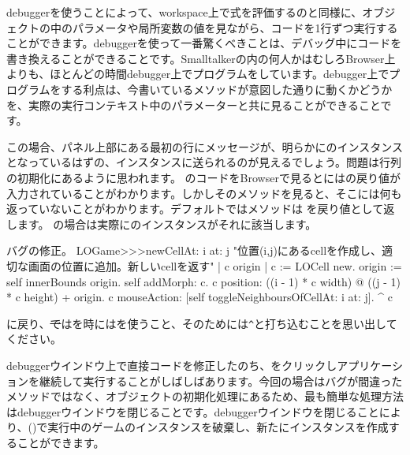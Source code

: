 \documentclass[a4paper,10pt,twoside]{book}
\begin{document}
debuggerを使うことによって、workspace上で式を評価するのと同様に、オブジェクトの中のパラメータや局所変数の値を見ながら、コードを1行ずつ実行することができます。debuggerを使って一番驚くべきことは、デバッグ中にコードを書き換えることができることです。Smalltalkerの内の何人かはむしろBrowser上よりも、ほとんどの時間debugger上でプログラムをしています。debugger上でプログラムをする利点は、今書いているメソッドが意図した通りに動くかどうかを、実際の実行コンテキスト中のパラメーターと共に見ることができることです。

この場合、パネル上部にある最初の行にメッセージが、明らかにのインスタンスとなっているはずの、インスタンスに送られるのが見えるでしょう。問題は行列の初期化にあるように思われます。
のコードをBrowserで見るとにはの戻り値が入力されていることがわかります。しかしそのメソッドを見ると、そこには何も返っていないことがわかります。デフォルトではメソッドは を戻り値として返します。  の場合は実際にのインスタンスがそれに該当します。

\dothis{debuggerウインドウを閉じで下さい。
その後\ct{c}を返すために、``\ct{^ c}''式を \ct{LOGame>>>newCellAt:at:}メソッドの最後に追加して下さい。
(\mthref{newCellAt:at:nobug}参照。)}

\begin{method}{バグの修正。}
LOGame>>>newCellAt: i at: j
   "位置(i,j)にあるcellを作成し、適切な画面の位置に追加。新しいcellを返す"
   | c origin |
   c := LOCell new.
   origin := self innerBounds origin.
   self addMorph: c.
   c position: ((i - 1) * c width) @ ((j - 1) * c height) + origin.
   c mouseAction: [self toggleNeighboursOfCellAt: i at: j].
   ^ c
\end{method}

\noindent
{}に戻り、\st ではを時には\ct{^}を使うこと、そのためには\verb|^|と打ち込むことを思い出してください。

debuggerウインドウ上で直接コードを修正したのち、をクリックしアプリケーションを継続して実行することがしばしばあります。今回の場合はバグが間違ったメソッドではなく、オブジェクトの初期化処理にあるため、最も簡単な処理方法はdebuggerウインドウを閉じることです。debuggerウインドウを閉じることにより、()で実行中のゲームのインスタンスを破棄し、新たにインスタンスを作成することができます。
\end{document}
